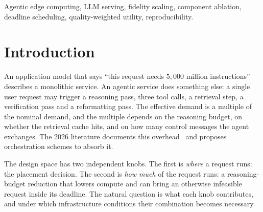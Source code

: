 \documentclass[journal,10pt]{IEEEtran}
\begin{document}
\begin{IEEEkeywords}
Agentic edge computing, LLM serving, fidelity scaling, component ablation,
deadline scheduling, quality-weighted utility, reproducibility.
\end{IEEEkeywords}

\section{Introduction}
\label{sec:intro}

An application model that says ``this request needs $5{,}000$ million
instructions'' describes a monolithic service. An agentic service does something
else: a single user request may trigger a reasoning pass, three tool calls, a
retrieval step, a verification pass and a reformatting pass. The effective
demand is a multiple of the nominal demand, and the multiple depends on the
reasoning budget, on whether the retrieval cache hits, and on how many control
messages the agent exchanges. The 2026 literature documents this
overhead~\cite{chen2026agenticenergy,he2026workflow,zhang2026agentic,liu2026aigc}
and proposes orchestration schemes to absorb it.

The design space has two independent knobs. The first is \emph{where} a request
runs: the placement decision. The second is \emph{how much} of the request runs:
a reasoning-budget reduction that lowers compute and can bring an otherwise
infeasible request inside its deadline. The natural question is what each knob
contributes, and under which infrastructure conditions their combination becomes
necessary.
\end{document}
